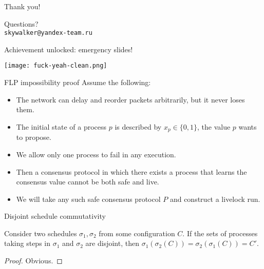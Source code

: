\documentclass{beamer}
\begin{document}
\begin{frame}{Thank you!}
  \begin{center}
    {\Huge Questions?} \\
    \vspace{1cm}
    {\huge \texttt{skywalker@yandex-team.ru}}
  \end{center}
\end{frame}

\begin{frame}{Achievement unlocked: emergency slides!}
  \begin{center}
    \texttt{[image: fuck-yeah-clean.png]}
  \end{center}
\end{frame}

\begin{frame}{FLP impossibility proof}
Assume the following:
  \begin{itemize}
    \item The network can delay and reorder packets arbitrarily, but it never loses them.
    \item The initial state of a process $p$ is described by $x_p \in \{ 0, 1 \}$, the value $p$ wants to propose.
    \item We allow only one process to fail in any execution.
    \item Then a consensus protocol in which there \alert{exists} a process that learns the consensus value cannot be both safe and live.
    \item We will take any such safe consensus protocol $P$ and construct a livelock run.
  \end{itemize}
\end{frame}

\begin{frame}{Disjoint schedule commutativity}
  \begin{lemma}
    Consider two schedules $\sigma_1, \sigma_2$ from some configuration $C$. If the sets of processes taking steps in $\sigma_1$ and $\sigma_2$ are disjoint, then $\sigma_1(\sigma_2(C)) = \sigma_2(\sigma_1(C)) = C'$.
  \end{lemma}
  \begin{proof}
    Obvious.
  \end{proof}
\end{frame}
\end{document}
